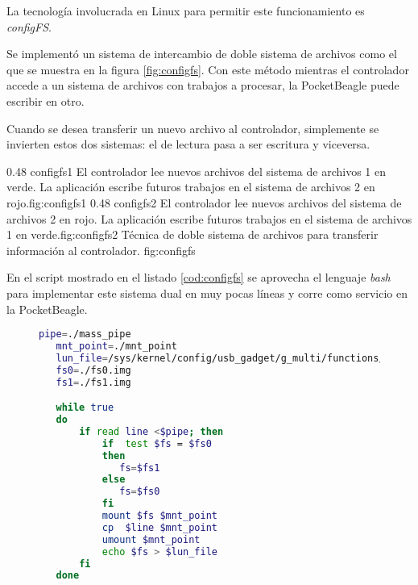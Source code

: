    La tecnología involucrada en Linux para permitir este funcionamiento es \mbox{\textit{configFS}\citep{WEBSITE:configfs}}.\par
   Se implementó un sistema de intercambio de doble sistema de archivos como el que se muestra en la figura \ref{fig:configfs}.
   Con este método mientras el controlador accede a un sistema de archivos con trabajos a procesar, la PocketBeagle puede escribir en otro.\par
   Cuando se desea transferir un nuevo archivo al controlador, simplemente se invierten estos dos sistemas: el de lectura pasa a ser escritura y viceversa.

\subfigab 
   {0.48} {configfs1} {El controlador lee nuevos archivos del sistema de archivos 1 en verde. La aplicación escribe futuros trabajos en el sistema de archivos 2 en rojo.}{fig:configfs1}
   {0.48} {configfs2} {El controlador lee nuevos archivos del sistema de archivos 2 en rojo. La aplicación escribe futuros trabajos en el sistema de archivos 1 en verde.}{fig:configfs2}
   {Técnica de doble sistema de archivos para transferir información al controlador.}
   {fig:configfs}

   En el script mostrado en el listado \ref{cod:configfs} se aprovecha el lenguaje \textit{bash} para implementar este sistema dual en muy pocas líneas y corre como servicio en la PocketBeagle.

\begin{figure}[h]
   \begin{lstlisting}[language=bash,caption={Implementación de doble sistema de archivos conectado con la tecnología configFS. Se aprovecha la potencia de \textit{bash} y se corre como servicio.},label={cod:configfs}]
   pipe=./mass_pipe
   mnt_point=./mnt_point
   lun_file=/sys/kernel/config/usb_gadget/g_multi/functions/mass_storage.usb0/lun.0/file
   fs0=./fs0.img
   fs1=./fs1.img

   while true
   do
       if read line <$pipe; then
           if  test $fs = $fs0
           then
              fs=$fs1
           else
              fs=$fs0
           fi
           mount $fs $mnt_point
           cp  $line $mnt_point
           umount $mnt_point
           echo $fs > $lun_file
       fi
   done
   \end{lstlisting}
\end{figure}


